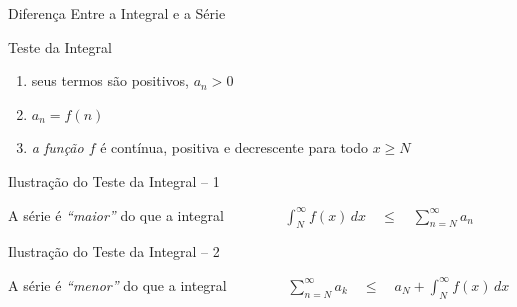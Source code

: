\documentclass[fleqn,utf8,aspectratio=169,12pt]{beamer}
\begin{document}
\begin{frame}{Diferença Entre a Integral e a Série}
  \begin{center}
    
  \end{center}
\end{frame}

\begin{frame}[t]{Teste da Integral}
  \begin{enumerate}[<+->]
    \item seus termos são positivos, $a_n>0$
    \item $a_n=f(n)$
    \item \emph{a função $f$} é contínua, positiva e decrescente para todo $x \geq N$
  \end{enumerate}

	\bigskip

  \smallskip

  \medskip
\end{frame}

\begin{frame}{Ilustração do Teste da Integral -- 1}
  \begin{center}
    \scalebox{.9}{}
  \end{center}

  \pause
  A série é \emph{``maior''} do que a integral
  \pause
  \(
    \qquad\qquad
    \int_{N}^{\infty} f(x)\,dx
    \quad\leq\quad
    \sum_{n=N}^{\infty} a_n
  \)
\end{frame}

\begin{frame}{Ilustração do Teste da Integral -- 2}
  \begin{center}
    \scalebox{.9}{}
  \end{center}

  \pause
  A série é \emph{``menor''} do que a integral
  \pause
  \(
    \qquad\qquad
    \sum_{n=N}^\infty a_k
    \quad\leq\quad
    a_{N} + \int_{N}^\infty f(x)\,dx
  \)
\end{frame}
\end{document}
